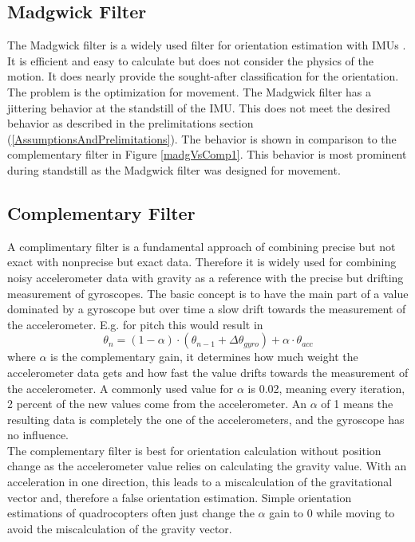 \documentclass[letterpaper, 10 pt, conference]{ieeeconf}  %
\begin{document}
\subsection{Madgwick Filter}
The Madgwick filter is a widely used filter for orientation estimation with IMUs \cite{c1}.
It is efficient and easy to calculate but does not consider the physics of the motion.
It does nearly provide the sought-after classification for  the orientation.
The problem is the optimization for movement. The Madgwick filter has a jittering behavior at the standstill of the IMU.
This does not meet the desired behavior as described in the prelimitations section (\ref{AssumptionsAndPrelimitations}).
The behavior is shown in comparison to the complementary filter in Figure \ref{madgVsComp1}.
This behavior is most prominent during standstill as the Madgwick filter was designed for movement.
\subsection{Complementary Filter}
A complimentary filter is a fundamental approach of combining precise but not exact with nonprecise but exact data.
Therefore it is widely used for combining noisy accelerometer data with gravity as a reference with the precise but drifting measurement of gyroscopes.
The basic concept is to have the main part of a value dominated by a gyroscope but over time a slow drift towards the measurement of the accelerometer.
E.g. for pitch this would result in 
\begin{equation}
\theta_n = (1-\alpha) \cdot (\theta_{n-1}+ \Delta\theta_{gyro})+ \alpha \cdot \theta_{acc}
\end{equation}
where $\alpha$ is the complementary gain, it determines how much weight the accelerometer data gets and how fast the value drifts towards the measurement of the accelerometer.
A commonly used value for $\alpha$ is 0.02, meaning every iteration, 2 percent of the new values come from the accelerometer.
An $\alpha$ of  1 means the resulting data is completely the one of the accelerometers, and the gyroscope has no influence. \\
The complementary filter is best for orientation calculation without position change as the accelerometer value relies on calculating the gravity value.
With an acceleration in one direction, this leads to a miscalculation of the gravitational vector and, therefore a false orientation estimation.
Simple orientation estimations of quadrocopters often just change the $\alpha$ gain to 0 while moving to avoid the miscalculation of the gravity vector. \cite{complementary}
\end{document}
